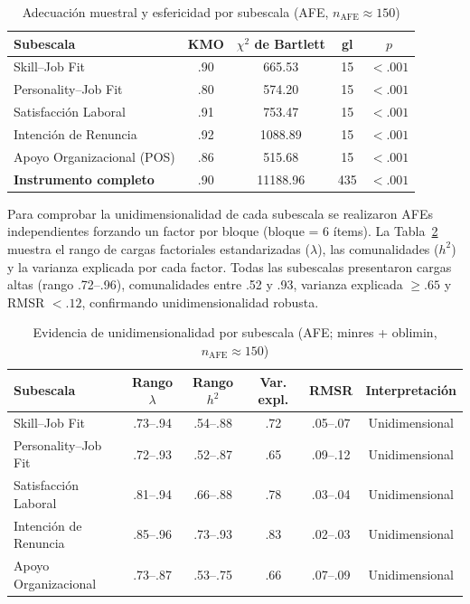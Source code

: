 \begin{table}[htbp]
\centering
\caption{Adecuación muestral y esfericidad por subescala (AFE, $n_{\text{AFE}}\approx150$)}
\label{tab:kmo-bartlett-resumen}
\small
\begin{tabular}{@{}lcccc@{}}
\toprule
\textbf{Subescala} & \textbf{KMO} & \textbf{$\chi^2$ de Bartlett} & \textbf{gl} & \textbf{$p$} \\
\midrule
Skill--Job Fit                & .90 &  665.53  &  15 & $<.001$ \\
Personality--Job Fit          & .80 &  574.20  &  15 & $<.001$ \\
Satisfacción Laboral          & .91 &  753.47  &  15 & $<.001$ \\
Intención de Renuncia         & .92 & 1088.89  &  15 & $<.001$ \\
Apoyo Organizacional (POS)    & .86 &  515.68  &  15 & $<.001$ \\
\midrule
\textbf{Instrumento completo} & .90 & 11188.96 & 435 & $<.001$ \\
\bottomrule
\end{tabular}
\end{table}

Para comprobar la unidimensionalidad de cada subescala se realizaron AFEs independientes forzando un factor por bloque (bloque = 6 ítems). La Tabla \ref{tab:unidimensionalidad-bloques} muestra el rango de cargas factoriales estandarizadas (\(\lambda\)), las comunalidades ($h^2$) y la varianza explicada por cada factor. Todas las subescalas presentaron cargas altas (rango .72–.96), comunalidades entre .52 y .93, varianza explicada $\geq .65$ y RMSR $<.12$, confirmando unidimensionalidad robusta.

\begin{table}[htbp]
\centering
\caption{Evidencia de unidimensionalidad por subescala (AFE; minres + oblimin, $n_{\text{AFE}}\approx150$)}
\label{tab:unidimensionalidad-bloques}
\small
\begin{tabular}{@{}lccccc@{}}
\toprule
\textbf{Subescala} & \textbf{Rango $\lambda$} & \textbf{Rango $h^2$} & \textbf{Var. expl.} & \textbf{RMSR} & \textbf{Interpretación} \\
\midrule
Skill--Job Fit           & .73--.94 & .54--.88 & .72 & .05–.07  & Unidimensional \\
Personality--Job Fit     & .72--.93 & .52--.87 & .65 & .09–.12  & Unidimensional \\
Satisfacción Laboral     & .81--.94 & .66--.88 & .78 & .03–.04  & Unidimensional \\
Intención de Renuncia    & .85--.96 & .73--.93 & .83 & .02–.03  & Unidimensional \\
Apoyo Organizacional     & .73--.87 & .53--.75 & .66 & .07–.09  & Unidimensional \\
\bottomrule
\end{tabular}
\end{table}

